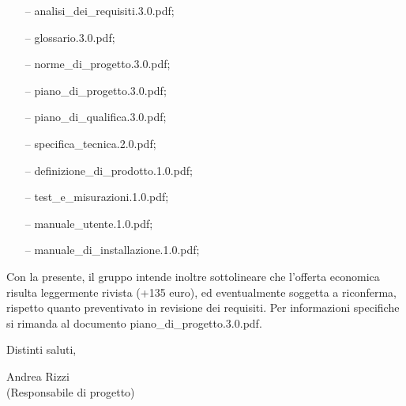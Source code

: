 \documentclass[a4paper,10pt]{letter}
\begin{document}
\begin{itemize}
\item[--] analisi\_dei\_requisiti.3.0.pdf;
\item[--] glossario.3.0.pdf;
\item[--] norme\_di\_progetto.3.0.pdf;
\item[--] piano\_di\_progetto.3.0.pdf;
\item[--] piano\_di\_qualifica.3.0.pdf;
\item[--] specifica\_tecnica.2.0.pdf;
\item[--] definizione\_di\_prodotto.1.0.pdf;
\item[--] test\_e\_misurazioni.1.0.pdf;
\item[--] manuale\_utente.1.0.pdf;
\item[--] manuale\_di\_installazione.1.0.pdf;
\end{itemize}
Con la presente, il gruppo intende inoltre sottolineare che l'offerta economica risulta leggermente rivista (+135 euro), ed eventualmente soggetta a riconferma, rispetto quanto preventivato in revisione dei requisiti. Per informazioni specifiche si rimanda al documento piano\_di\_progetto.3.0.pdf.


Distinti saluti,\\

\begin{flushright}
\begin{minipage}[t]{.35\textwidth}
Andrea Rizzi\\
(Responsabile di progetto)
\end{minipage}
\end{flushright}
\end{document}
